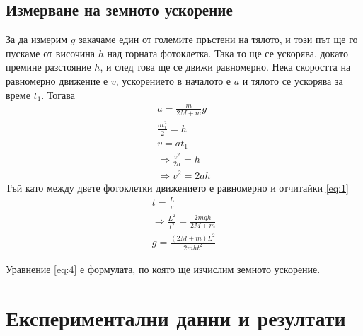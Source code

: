 \documentclass[aps, prb, twocolumn, a4paper, floatfix, reprint]{revtex4-2}
\begin{document}
\subsection{Измерване на земното ускорение}
За да измерим $g$ закачаме един от големите пръстени на тялото, и този път ще го пускаме от височина $h$ над горната фотоклетка. Така то ще се ускорява, докато премине разстояние $h$, и след това ще се движи равномерно. Нека скоростта на равномерно движение е $v$, ускорението в началото е $a$ и тялото се ускорява за време $t_1$. Тогава 
\begin{gather*}
    a = \frac{m}{2M + m} g\\
    \frac{at_1^2}{2} = h\\
    v = at_1 \\
    \Rightarrow \frac{v^2}{2a} = h\\
    \Rightarrow v^2 = 2ah\label{eq:3} \tag{3}
\end{gather*} 
Тъй като между двете фотоклетки движението е равномерно и отчитайки \eqref{eq:1} 
\begin{gather*}
    t = \frac{L}{v} \\
    \Rightarrow \frac{L^2}{t^2} = \frac{2mgh}{2M + m} \\
    g = \frac{(2M + m)L^2}{2mht^2} \label{eq:4} \tag{4}
\end{gather*}

Уравнение \eqref{eq:4} е формулата, по която ще изчислим земното ускорение.

\section{Експериментални данни и резултати}
\end{document}

